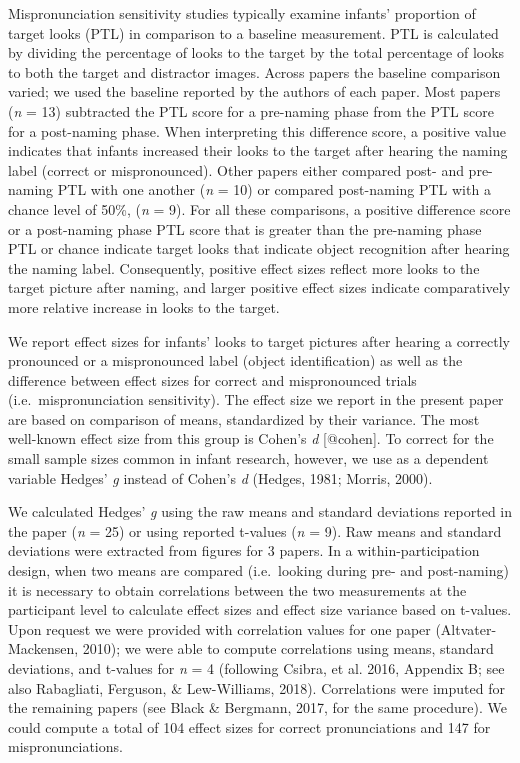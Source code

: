 \documentclass[man]{apa6}
\theoremstyle{definition}
\theoremstyle{definition}
\theoremstyle{definition}
\theoremstyle{remark}
\begin{document}
Mispronunciation sensitivity studies typically examine infants'
proportion of target looks (PTL) in comparison to a baseline
measurement. PTL is calculated by dividing the percentage of looks to
the target by the total percentage of looks to both the target and
distractor images. Across papers the baseline comparison varied; we used
the baseline reported by the authors of each paper. Most papers
(\emph{n} = 13) subtracted the PTL score for a pre-naming phase from the
PTL score for a post-naming phase. When interpreting this difference
score, a positive value indicates that infants increased their looks to
the target after hearing the naming label (correct or mispronounced).
Other papers either compared post- and pre-naming PTL with one another
(\emph{n} = 10) or compared post-naming PTL with a chance level of 50\%,
(\emph{n} = 9). For all these comparisons, a positive difference score
or a post-naming phase PTL score that is greater than the pre-naming
phase PTL or chance indicate target looks that indicate object
recognition after hearing the naming label. Consequently, positive
effect sizes reflect more looks to the target picture after naming, and
larger positive effect sizes indicate comparatively more relative
increase in looks to the target.

We report effect sizes for infants' looks to target pictures after
hearing a correctly pronounced or a mispronounced label (object
identification) as well as the difference between effect sizes for
correct and mispronounced trials (i.e.~mispronunciation sensitivity).
The effect size we report in the present paper are based on comparison
of means, standardized by their variance. The most well-known effect
size from this group is Cohen's \emph{d} {[}@cohen{]}. To correct for
the small sample sizes common in infant research, however, we use as a
dependent variable Hedges' \emph{g} instead of Cohen's \emph{d} (Hedges,
1981; Morris, 2000).

We calculated Hedges' \emph{g} using the raw means and standard
deviations reported in the paper (\emph{n} = 25) or using reported
t-values (\emph{n} = 9). Raw means and standard deviations were
extracted from figures for 3 papers. In a within-participation design,
when two means are compared (i.e.~looking during pre- and post-naming)
it is necessary to obtain correlations between the two measurements at
the participant level to calculate effect sizes and effect size variance
based on t-values. Upon request we were provided with correlation values
for one paper (Altvater-Mackensen, 2010); we were able to compute
correlations using means, standard deviations, and t-values for \emph{n}
= 4 (following Csibra, et al. 2016, Appendix B; see also Rabagliati,
Ferguson, \& Lew-Williams, 2018). Correlations were imputed for the
remaining papers (see Black \& Bergmann, 2017, for the same procedure).
We could compute a total of 104 effect sizes for correct pronunciations
and 147 for mispronunciations.
\end{document}
